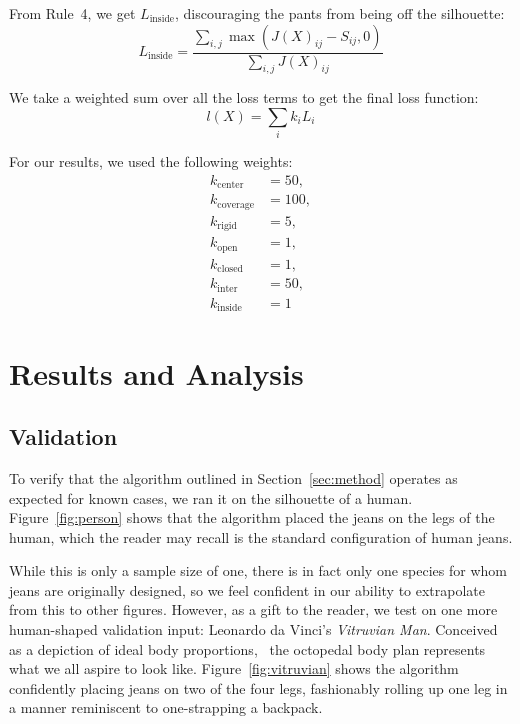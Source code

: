 \documentclass[twocolumn]{article}
\begin{document}
From Rule~4, we get $L_\text{inside}$, discouraging the pants from being off the silhouette:
\begin{equation}
    L_\text{inside} = \frac{\sum_{i,j} \max{\left( J(X)_{ij} - S_{ij}, 0 \right)}}{\sum_{i,j}J(X)_{ij}}
\end{equation}

We take a weighted sum over all the loss terms to get the final loss function:
\begin{equation}
    l(X) = \sum_{i} k_i L_i
\end{equation}

For our results, we used the following weights:
\begin{align*}
    k_\text{center} &= 50, \\
    k_\text{coverage} &= 100, \\
    k_\text{rigid} &= 5, \\
    k_\text{open} &= 1, \\
    k_\text{closed} &= 1, \\
    k_\text{inter} &= 50, \\
    k_\text{inside} &= 1
\end{align*}

\section{Results and Analysis}

\subsection{Validation}

To verify that the algorithm outlined in Section~\ref{sec:method} operates as expected for known cases, we ran it on the silhouette of a human. Figure~\ref{fig:person} shows that the algorithm placed the jeans on the legs of the human, which the reader may recall is the standard configuration of human jeans.

While this is only a sample size of one, there is in fact only one species for whom jeans are originally designed, so we feel confident in our ability to extrapolate from this to other figures. However, as a gift to the reader, we test on one more human-shaped validation input: Leonardo da Vinci's \textit{Vitruvian Man}. Conceived as a depiction of ideal body proportions,~\cite{wikipedia_2023} the octopedal body plan represents what we all aspire to look like. Figure~\ref{fig:vitruvian} shows the algorithm confidently placing jeans on two of the four legs, fashionably rolling up one leg in a manner reminiscent to one-strapping a backpack.~\cite{jumpst}
\end{document}
